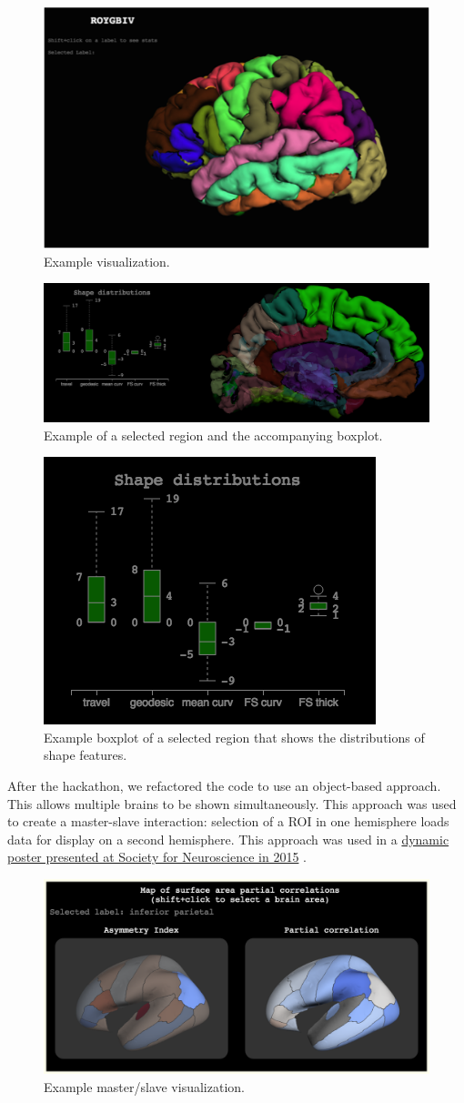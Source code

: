 \documentclass[twocolumn]{bmcart}%
\begin{document}
\begin{figure}[h!] \includegraphics[width=.42\textwidth]{roygbiv.png} \caption{\label{centfig} Example visualization.} \end{figure}

\begin{figure}[h!] \includegraphics[width=.42\textwidth]{d3_boxplot.png} \caption{\label{d3box} Example of a selected region and the accompanying boxplot.} \end{figure}

\begin{figure}[h!] \includegraphics[width=.42\textwidth]{d3_boxplot_alone.png} \caption{\label{d3boxalone} Example boxplot of a selected region that shows the distributions of shape features.} \end{figure}

After the hackathon, we refactored the code to use an object-based
approach. This allows multiple brains to be shown simultaneously. This
approach was used to create a master-slave interaction: selection of a
ROI in one hemisphere loads data for display on a second hemisphere.
This approach was used in a
\href{http://cseweb.ucsd.edu/~bcipolli/docs/posters/SfN2015/}{dynamic
poster presented at Society for Neuroscience in 2015}
\cite{Cipollini2015}.

\begin{figure}[h!] \includegraphics[width=.42\textwidth]{roygbiv-master-slave.png} \caption{\label{master} Example master/slave visualization.} \end{figure}
\end{document}
